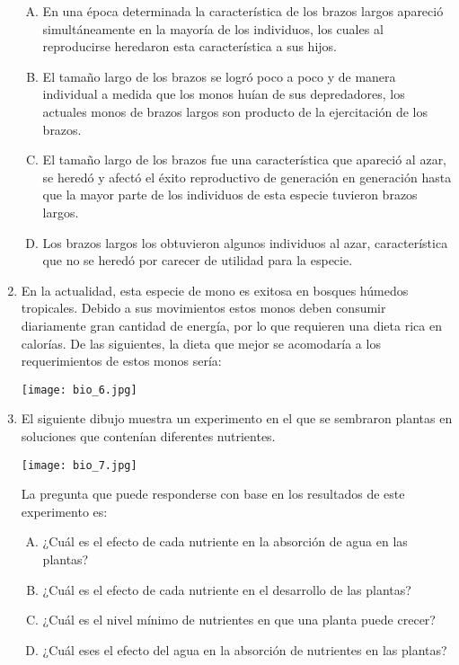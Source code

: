 \begin{enumerate}
\begin{enumerate}[(A)]
\item En una época determinada la característica de los brazos largos apareció simultáneamente en la mayoría de los individuos, los cuales al reproducirse heredaron esta característica a sus hijos.
\item El tamaño largo de los brazos se logró poco a poco y de manera individual a medida que los monos huían de sus depredadores, los actuales monos de brazos largos son producto de la ejercitación de los brazos.
\item El tamaño largo de los brazos fue una característica que apareció al azar, se heredó y afectó el éxito reproductivo de generación en generación hasta que la mayor parte de los individuos de esta especie tuvieron brazos largos.
\item Los brazos largos los obtuvieron algunos individuos al azar, característica que no se heredó por carecer de utilidad para la especie.
\end{enumerate}

\item En la actualidad, esta especie de mono es exitosa en bosques húmedos tropicales. Debido a sus movimientos estos monos deben consumir diariamente gran cantidad de energía, por lo que requieren una dieta rica en calorías. De las siguientes, la dieta que mejor se acomodaría a los requerimientos de estos monos sería: \label{bio-8}
\begin{flushleft}
\texttt{[image: bio\_6.jpg]} 
\end{flushleft}



\item El siguiente dibujo muestra un experimento en el que se sembraron plantas en soluciones que contenían diferentes nutrientes. \label{bio-9}


\begin{flushleft}
\texttt{[image: bio\_7.jpg]} 
\end{flushleft}

La pregunta que puede responderse con base en los resultados de este experimento es:

\begin{enumerate}[(A)]
\item ¿Cuál  es el efecto de cada nutriente en la absorción de agua en las plantas?
\item ¿Cuál  es el efecto de cada nutriente en el desarrollo de las plantas?
\item ¿Cuál  es el nivel mínimo de nutrientes en que una planta puede crecer?
\item ¿Cuál  eses el efecto del agua en la absorción de nutrientes en las plantas?
\end{enumerate}


\end{enumerate}
